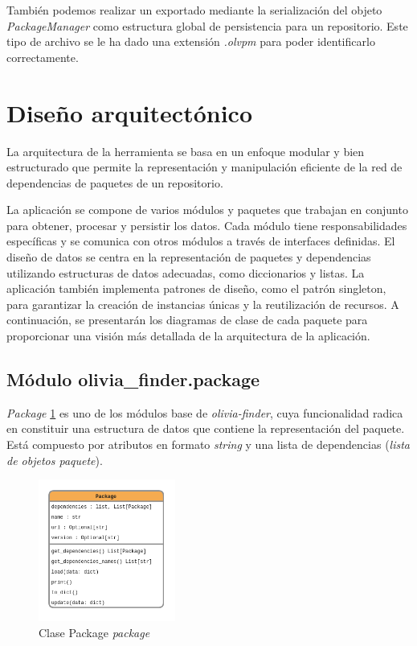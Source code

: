 También podemos realizar un exportado mediante la serialización del objeto \textit{PackageManager}
como estructura global de persistencia para un repositorio. Este tipo de archivo se le ha dado una
extensión \textit{.olvpm} para poder identificarlo correctamente.

\section{Diseño arquitectónico}

La arquitectura de la herramienta se basa en un enfoque modular y bien estructurado que permite la
representación y manipulación eficiente de la red de dependencias de paquetes de un repositorio.

La aplicación se compone de varios módulos y paquetes que trabajan en conjunto para obtener, procesar y persistir los datos.
Cada módulo tiene responsabilidades específicas y se comunica con otros módulos a través de interfaces definidas.
El diseño de datos se centra en la representación de paquetes y dependencias utilizando estructuras de datos
adecuadas, como diccionarios y listas. La aplicación también implementa patrones de diseño, como el patrón singleton,
para garantizar la creación de instancias únicas y la reutilización de recursos. A continuación, se presentarán
los diagramas de clase de cada paquete para proporcionar una visión más detallada de la arquitectura de
la aplicación.

\subsection{Módulo olivia\_finder.package}

\textit{Package} \ref{fig:package} es uno de los módulos base de \textit{olivia-finder}, cuya funcionalidad radica en
constituir una estructura de datos que contiene la representación del paquete. Está compuesto por
atributos en formato \textit{string} y una lista de dependencias (\textit{lista de objetos paquete}).

\begin{figure}[ht!]
    \centering
    \includegraphics[width=0.4\textwidth]{img/anexos/package.png}
    \caption{Clase Package \textit{package}}
    \label{fig:package}
\end{figure}


